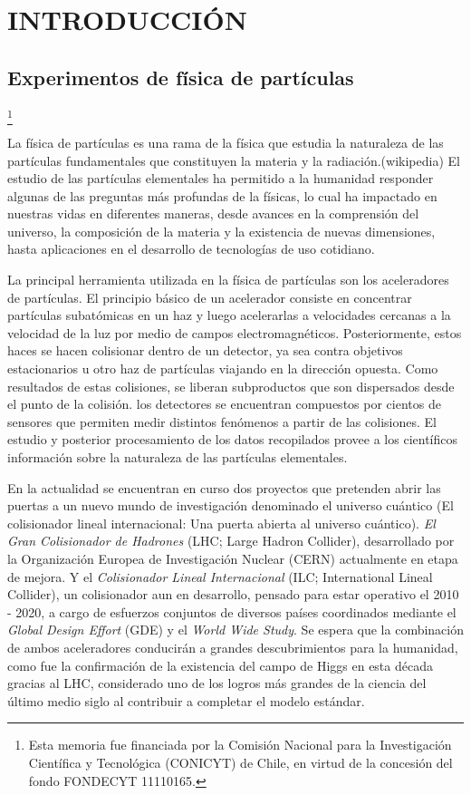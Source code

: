 \newcommand\blfootnote[1]{%
  \begingroup
  \renewcommand\thefootnote{}\footnote{#1}%
  \addtocounter{footnote}{-1}%
  \endgroup
}

\chapter{INTRODUCCIÓN}
\label{chapter:introduction}
\section{Experimentos de física de partículas}
\blfootnote{Esta memoria fue financiada por la Comisión Nacional para la Investigación Científica y Tecnológica (CONICYT) de Chile, en virtud de la concesión del fondo FONDECYT  11110165.} 


La física de partículas es una rama de la física que estudia la naturaleza de las partículas fundamentales que constituyen la materia y la radiación.(wikipedia) El estudio de las partículas elementales ha permitido a la humanidad responder algunas de las preguntas más profundas de la físicas, lo cual ha impactado en nuestras vidas en diferentes maneras, desde avances en la comprensión del universo, la composición de la materia y la existencia de nuevas dimensiones, hasta aplicaciones en el desarrollo de tecnologías de uso cotidiano. 

La principal herramienta utilizada en la física de partículas son los aceleradores de partículas. El principio básico de un acelerador consiste en concentrar partículas subatómicas en un haz y luego acelerarlas a velocidades cercanas a la velocidad de la luz por medio de campos electromagnéticos. Posteriormente, estos haces se hacen colisionar dentro de un detector, ya sea contra objetivos estacionarios u otro haz de partículas viajando en la dirección opuesta.  Como resultados de estas colisiones, se liberan subproductos que son dispersados desde el punto de la colisión. los detectores se encuentran compuestos por cientos de sensores que permiten medir distintos fenómenos a partir de las colisiones. El estudio y posterior procesamiento de los datos recopilados  provee a los científicos información sobre la naturaleza de las partículas elementales.

En la actualidad se encuentran en curso dos proyectos que pretenden abrir las puertas a un nuevo mundo de investigación denominado el universo cuántico (El colisionador lineal internacional: Una puerta abierta al universo cuántico). \textit{El Gran Colisionador de Hadrones} (LHC; Large Hadron Collider), desarrollado por la Organización Europea de Investigación Nuclear (CERN) actualmente en etapa de mejora. Y el \textit{Colisionador Lineal Internacional} (ILC; International Lineal Collider), un colisionador aun en desarrollo, pensado para estar operativo el 2010 - 2020, a cargo de esfuerzos conjuntos de diversos países coordinados mediante el \textit{Global Design Effort} (GDE) y el \textit{World Wide Study}. Se espera que la combinación de ambos aceleradores conducirán a grandes descubrimientos para la humanidad, como fue la confirmación de la existencia del campo de Higgs en esta década gracias al LHC, considerado uno de los logros más grandes de la ciencia del último medio siglo al contribuir a completar el modelo estándar.

